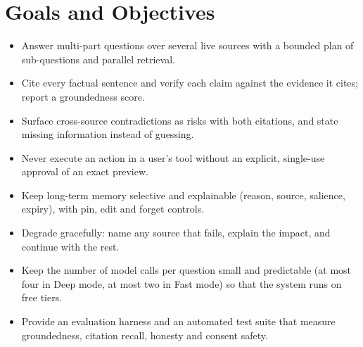 \documentclass[oneside,a4paper,12pt]{report}
\begin{document}
\section{Goals and Objectives}
\begin{itemize}
	\item Answer multi-part questions over several live sources with a bounded plan of sub-questions and parallel retrieval.
	\item Cite every factual sentence and verify each claim against the evidence it cites; report a groundedness score.
	\item Surface cross-source contradictions as risks with both citations, and state missing information instead of guessing.
	\item Never execute an action in a user's tool without an explicit, single-use approval of an exact preview.
	\item Keep long-term memory selective and explainable (reason, source, salience, expiry), with pin, edit and forget controls.
	\item Degrade gracefully: name any source that fails, explain the impact, and continue with the rest.
	\item Keep the number of model calls per question small and predictable (at most four in Deep mode, at most two in Fast mode) so that the system runs on free tiers.
	\item Provide an evaluation harness and an automated test suite that measure groundedness, citation recall, honesty and consent safety.
\end{itemize}
\end{document}
